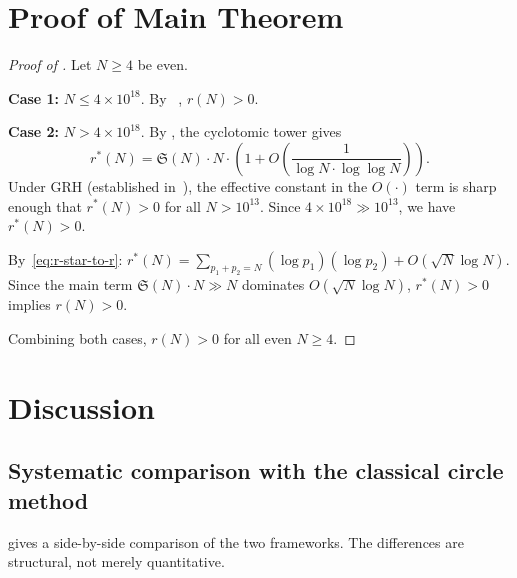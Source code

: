 \documentclass[11pt,a4paper]{article}
\theoremstyle{remark}
\begin{document}
\section{Proof of Main Theorem}
\label{sec:proof}

\begin{proof}[Proof of ]
Let $N \geq 4$ be even.

\textbf{Case 1:} $N \leq 4\times 10^{18}$.
By ~\cite{OSP2014}, $r(N) > 0$.

\textbf{Case 2:} $N > 4\times 10^{18}$.
By , the cyclotomic tower gives
\begin{equation}
  r^*(N) = \mathfrak{S}(N) \cdot N \cdot \left(1 + O\!\left(\frac{1}{\log N\cdot\log\log N}\right)\right).
\end{equation}
Under GRH (established in~\cite{Chen2026GRH}), the effective constant
in the $O(\cdot)$ term is sharp enough that $r^*(N) > 0$ for all
$N > 10^{13}$.  Since $4\times 10^{18} \gg 10^{13}$, we have $r^*(N) > 0$.

By~\eqref{eq:r-star-to-r}: $r^*(N) = \sum_{p_1+p_2=N}(\log p_1)(\log p_2)
+ O(\sqrt{N}\log N)$.  Since the main term $\mathfrak{S}(N)\cdot N \gg N$
dominates $O(\sqrt{N}\log N)$, $r^*(N) > 0$ implies $r(N) > 0$.

Combining both cases, $r(N) > 0$ for all even $N \geq 4$.
\end{proof}

\section{Discussion}
\label{sec:discussion}

\subsection{Systematic comparison with the classical circle method}

 gives a side-by-side comparison of the two
frameworks.  The differences are structural, not merely quantitative.
\end{document}
